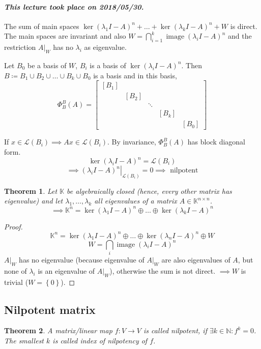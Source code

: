 \documentclass{article}
\newtheorem{theorem}{Theorem}  \numberwithin{theorem}{section}
\newcommand{\set}[1]{\left\{#1\right\}}
\newcommand{\dateref}[1]{\paragraph{\textit{This lecture took place on #1.}}}
\DeclareMathOperator{\im}{image}
\begin{document}
\dateref{2018/05/30}

The sum of main spaces $\ker(\lambda_1 I - A)^n + \dots + \ker(\lambda_k I - A)^n + W$ is direct.
The main spaces are invariant and also $W = \bigcap_{i=1}^k \im(\lambda_i I - A)^n$ and the
restriction $A|_W$ has no $\lambda_i$ as eigenvalue.

Let $B_0$ be a basis of $W$, $B_i$ is a basis of $\ker(\lambda_i I - A)^n$.
Then $B \coloneqq B_1 \cup B_2 \cup \dots \cup B_k \cup B_0$ is a basis and in this basis,
\[
  \Phi_B^B(A) = \begin{bmatrix}
    [B_1] &       &        &       &       \\
          & [B_2] &        &       &       \\
          &       & \ddots &       &       \\
          &       &        & [B_k] &       \\
          &       &        &       & [B_0]
  \end{bmatrix}
\]

If $x \in \mathcal L(B_i) \implies Ax \in \mathcal L(B_i)$.
By invariance, $\Phi_B^B(A)$ has block diagonal form.
\[ \ker(\lambda_i I - A)^n = \mathcal L(B_i) \]
\[ \implies \left. (\lambda_i I - A)^n \right|_{\mathcal L(B_i)} = 0 \implies \text{ nilpotent} \]

\begin{theorem} %
  \label{thm:1115}
  Let $\mathbb K$ be algebraically closed (hence, every other matrix has eigenvalue)
  and let $\lambda_1, \dots, \lambda_k$ all eigenvalues of a matrix $A \in \mathbb K^{n\times n}$.
  \[ \implies \mathbb K^{n} = \ker(\lambda_1 I - A)^n \oplus \dots \oplus \ker(\lambda_k I - A)^n \]
\end{theorem}

\begin{proof}
  \[ \mathbb K^n = \ker(\lambda_1 I - A)^n \oplus \dots \oplus \ker(\lambda_n I - A)^n \oplus W \]
  \[ W = \bigcap_i \im(\lambda_i I - A)^n \]
  $A|_W$ has no eigenvalue (because eigenvalue of $A|_W$ are also eigenvalues of $A$, but none of $\lambda_i$ is an eigenvalue of $A|_W$), otherwise the sum is not direct.
  $\implies W$ is trivial ($W = \set{0}$).
\end{proof}

\subsection{Nilpotent matrix}

\begin{theorem}
  A matrix/linear map $f: V \to V$ is called \emph{nilpotent}, if $\exists k \in \mathbb N: f^k = 0$.
  The smallest $k$ is called \emph{index} of nilpotency of $f$.
\end{theorem}
\end{document}

